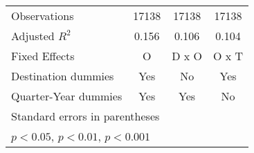 \begin{table}[htbp]
\begin{tabular}{l*{3}{c}}
\hline
Observations        &       17138         &       17138         &       17138         \\
Adjusted \(R^{2}\)  &       0.156         &       0.106         &       0.104         \\
Fixed Effects       &           O         &       D x O         &       O x T         \\
Destination dummies &         Yes         &          No         &         Yes         \\
Quarter-Year dummies&         Yes         &         Yes         &          No         \\
\hline\hline
\multicolumn{4}{l}{\footnotesize Standard errors in parentheses}\\
\multicolumn{4}{l}{\footnotesize \sym{*} \(p<0.05\), \sym{**} \(p<0.01\), \sym{***} \(p<0.001\)}\\
\end{tabular}
\end{table}
